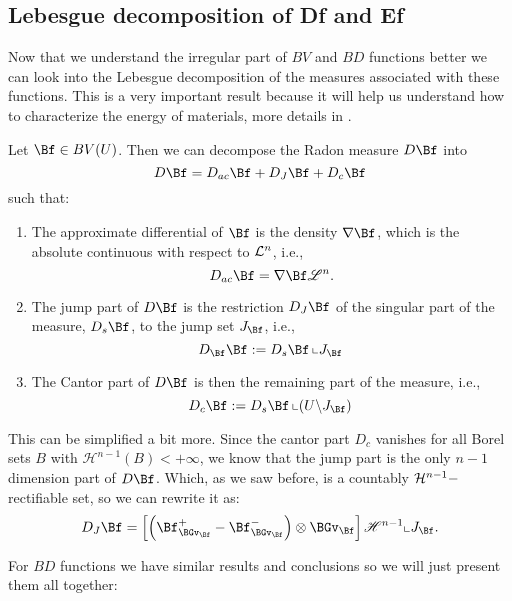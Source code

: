 \subsection{Lebesgue decomposition of Df and Ef}

Now that we understand the irregular part of $BV$ and $BD$ functions better we can look into the Lebesgue decomposition of the measures associated with these functions. This is a very important result because it will help us understand how to characterize the energy of materials, more details in \cite{Ambrosio1997}.
\begin{definition} Let $\Bf \in B V(U)$. Then we can decompose the Radon measure $D\Bf$ into
$$D \Bf=D _{ac}\Bf+D_J\Bf +D_c\Bf$$
such that:
\begin{enumerate}
\item The approximate differential of $\Bf$ is the density $\nabla \Bf$, which is the absolute continuous with respect to ${\mathcal L}^n$, i.e., $$D_{ac} \Bf=\nabla \Bf \mathscr{L}^n.$$
\item The jump part of $D \Bf$ is the restriction $D_J \Bf$ of the singular part of the measure, $D_s \Bf$, to the jump set $J_\Bf$, i.e., 
$$D_\Bf \Bf:=D_s \Bf\left\llcorner J_\Bf\right .$$
\item The Cantor part of $D \Bf$ is then the remaining part of the measure, i.e., 
$$D_c \Bf:=D_s \Bf\left\llcorner\left(U \backslash J_\Bf\right)\right .$$
\end{enumerate}
\end{definition}

This can be simplified a bit more. Since the cantor part $D_c$ vanishes for all Borel sets $B$ with $\mathscr{H}^{n-1}(B)<+\infty$, we know that the jump part is the only $n-1$ dimension part of $D\Bf$. Which, as we saw before, is a countably ${\mathcal H}^{n-1}-$rectifiable set, so we can rewrite it as:
$$D_J  \Bf=\left[\left(\Bf_{\BGv_\Bf}^{+}-\Bf_{\BGv_\Bf}^{-}\right) \otimes \BGv_\Bf \right]\mathscr{H}^{n-1}\llcorner J_\Bf.$$

For $BD$ functions we have similar results and conclusions so we will just present them all together:

